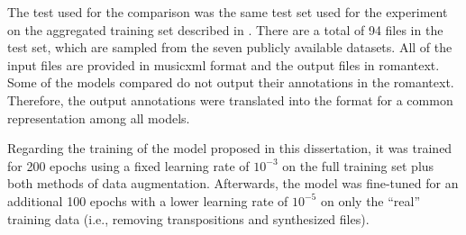 
The test used for the comparison was the same test set used
for the experiment on the aggregated training set described
in . There are a
total of 94 files in the test set, which are sampled from
the seven publicly available datasets. All of the input
files are provided in \gls{musicxml} format and the output
files in \gls{romantext}. Some of the models compared do not
output their annotations in the \gls{romantext}. Therefore,
the output annotations were translated into the format for a
common representation among all models.

Regarding the training of the model proposed in this
dissertation, it was trained for 200 epochs using a fixed
learning rate of $10^{-3}$ on the full training set plus
both methods of data augmentation. Afterwards, the model was
fine-tuned for an additional 100 epochs with a lower
learning rate of $10^{-5}$ on only the ``real'' training
data (i.e., removing transpositions and synthesized files).


